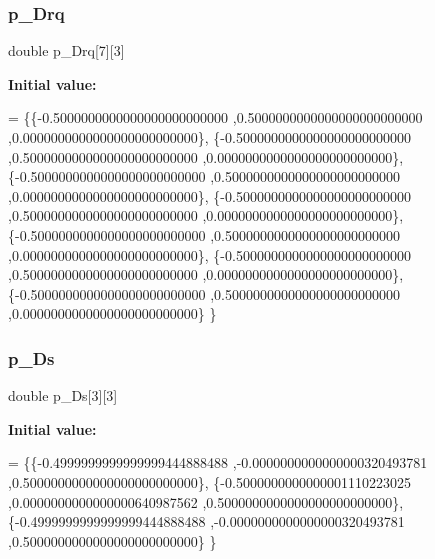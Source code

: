 \subsubsection{\texorpdfstring{p\+\_\+\+Drq}{p\_Drq}}
{\footnotesize\ttfamily double p\+\_\+\+Drq\mbox{[}7\mbox{]}\mbox{[}3\mbox{]}}

{\bfseries Initial value\+:}
\begin{DoxyCode}
= \{\{-0.5000000000000000000000000 ,0.5000000000000000000000000 ,0.0000000000000000000000000\},
\{-0.5000000000000000000000000 ,0.5000000000000000000000000 ,0.0000000000000000000000000\},
\{-0.5000000000000000000000000 ,0.5000000000000000000000000 ,0.0000000000000000000000000\},
\{-0.5000000000000000000000000 ,0.5000000000000000000000000 ,0.0000000000000000000000000\},
\{-0.5000000000000000000000000 ,0.5000000000000000000000000 ,0.0000000000000000000000000\},
\{-0.5000000000000000000000000 ,0.5000000000000000000000000 ,0.0000000000000000000000000\},
\{-0.5000000000000000000000000 ,0.5000000000000000000000000 ,0.0000000000000000000000000\}
\}
\end{DoxyCode}
\mbox{\label{a00987_afe9c30056feb5271f416346c6ea6c40e}} 
\subsubsection{\texorpdfstring{p\+\_\+\+Ds}{p\_Ds}}
{\footnotesize\ttfamily double p\+\_\+\+Ds\mbox{[}3\mbox{]}\mbox{[}3\mbox{]}}

{\bfseries Initial value\+:}
\begin{DoxyCode}
= \{\{-0.4999999999999999444888488 ,-0.0000000000000000320493781 ,0.5000000000000000000000000\},
\{-0.5000000000000001110223025 ,0.0000000000000000640987562 ,0.5000000000000000000000000\},
\{-0.4999999999999999444888488 ,-0.0000000000000000320493781 ,0.5000000000000000000000000\}
\}
\end{DoxyCode}
\mbox{\label{a00987_a6b1b66ffaf2ab05891fcc3755f95ad80}} 
